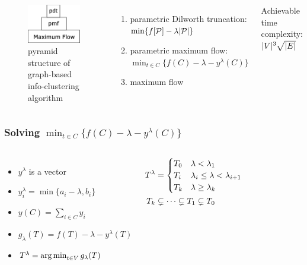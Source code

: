 \documentclass[notheorems]{beamer}
\begin{document}
\begin{frame}
\begin{columns}
\column{4cm}
\begin{figure}[!ht]
\centering
\includegraphics[width=4cm]{pic/pdt.eps}
\caption{pyramid structure of graph-based info-clustering algorithm}\label{fig:ps}
\end{figure}
\column{6cm}
\begin{enumerate}
\item parametric Dilworth truncation: $\min \{f[\mathcal{P}] -\lambda \lvert\mathcal{P}\rvert\}$
\item parametric maximum flow: $\min_{t\in C} \{f(C) - \lambda - y^{\lambda}(C)\}$
\item maximum flow
\end{enumerate}
Achievable time complexity: $\lvert V\rvert^3 \sqrt{\lvert E\rvert}$
\end{columns}
\end{frame}
\begin{frame}
	\frametitle{Solving $\min_{t\in C} \{f(C) - \lambda - y^{\lambda}(C)\}$}
	\begin{columns}
    \column{5.3cm}
    \begin{itemize}
	\item $y^{\lambda}$ is a vector
	\item $y^{\lambda}_i = \min\{a_i - \lambda, b_i\}$ 
	\item $y(C) = \sum_{i \in C} y_i$	
	\item $g_{\lambda}(T) = f(T) - \lambda - y^{\lambda}(T)$
	\item $T^{\lambda} = \operatorname*{arg\,min}_{t\in V} g_{\lambda}(T)$
	\end{itemize}
	\begin{theorem}
		\begin{align}\notag
			T^{\lambda} & =\begin{cases}
				T_0 & \lambda < \lambda_1 \\
				T_i & \lambda_i \leq \lambda < \lambda_{i+1}\\
				T_k & \lambda \geq \lambda_{k}
			\end{cases} \\
				T_k & \subsetneq  \dots \subsetneq T_1 \subsetneq T_0 \label{eq:Alambda}				
		\end{align}
    \end{theorem}
	\column{4.7cm}
		
    \end{columns}
\end{frame}
\end{document}
